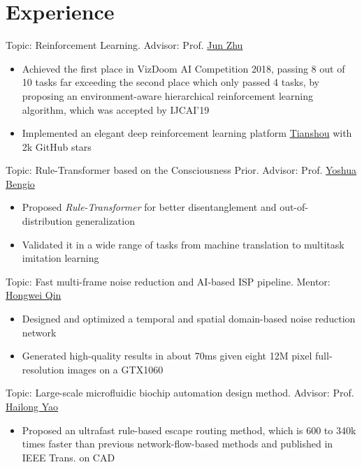 \documentclass{resume}
\begin{document}
\section{Experience}
Topic: Reinforcement Learning. Advisor: Prof. \href{http://ml.cs.tsinghua.edu.cn/~jun/index.shtml}{Jun Zhu}
\begin{itemize}
\item Achieved the first place in VizDoom AI Competition 2018, passing 8 out of 10 tasks far exceeding the second place which only passed 4 tasks, by proposing an environment-aware hierarchical reinforcement learning algorithm, which was accepted by IJCAI'19
\item Implemented an elegant deep reinforcement learning platform \href{https://github.com/thu-ml/tianshou}{Tianshou} with 2k GitHub stars
\end{itemize}

Topic: Rule-Transformer based on the Consciousness Prior. Advisor: Prof. \href{https://mila.quebec/en/yoshua-bengio/}{Yoshua Bengio}
\begin{itemize}
    \item Proposed \textit{Rule-Transformer} for better disentanglement and out-of-distribution generalization
    \item Validated it in a wide range of tasks from machine translation to multitask imitation learning
\end{itemize}

Topic: Fast multi-frame noise reduction and AI-based ISP pipeline. Mentor: \href{http://qinhongwei.com/academic/}{Hongwei Qin}
\begin{itemize}
    \item Designed and optimized a temporal and spatial domain-based noise reduction network
    \item Generated high-quality results in about 70ms given eight 12M pixel full-resolution images on a GTX1060
\end{itemize}

Topic: Large-scale microfluidic biochip automation design method. Advisor: Prof. \href{http://biocad.cs.tsinghua.edu.cn/static/hailongyao.html}{Hailong Yao}
\begin{itemize}
\item Proposed an ultrafast rule-based escape routing method, which is 600 to 340k times faster than previous network-flow-based methods and published in IEEE Trans. on CAD
\end{itemize}
\end{document}
